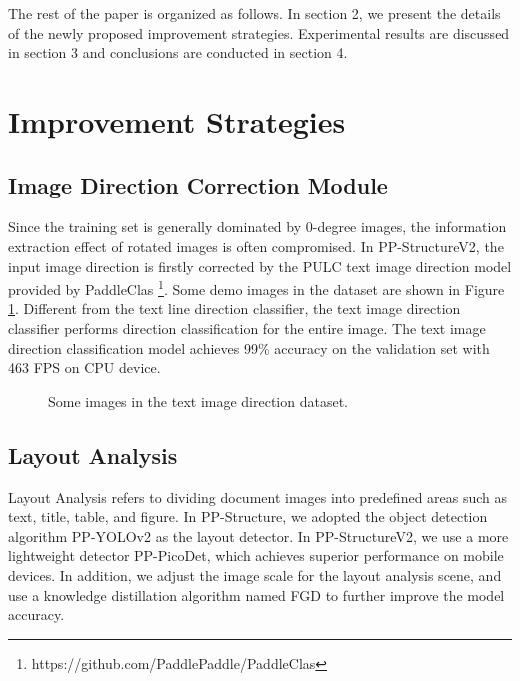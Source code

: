 \documentclass[letterpaper]{article} \usepackage{aaai21}  \usepackage{times}  \usepackage{helvet} \usepackage{courier}  \usepackage[hyphens]{url}  \usepackage{graphicx} \usepackage{algorithm}
\begin{document}
The rest of the paper is organized as follows. In section 2, we present the details of the newly proposed improvement strategies. Experimental results are discussed in section 3 and conclusions are conducted in section 4.

\section{Improvement Strategies}
 
\subsection{Image Direction Correction Module}

Since the training set is generally dominated by 0-degree images, the information extraction effect of rotated images is often compromised. In PP-StructureV2, the input image direction is firstly corrected by the PULC text image direction model\cite{PULC_text_image_orientation} provided by PaddleClas \footnote{https://github.com/PaddlePaddle/PaddleClas}. Some demo images in the dataset are shown in Figure \ref{text_image_orientation_data_demo}. Different from the text line direction classifier, the text image direction classifier performs direction classification for the entire image. The text image direction classification model achieves 99\% accuracy on the validation set with 463 FPS on CPU device.

\begin{figure}[]
\centering
{}
\caption{Some images in the text image direction dataset.}
\label{text_image_orientation_data_demo}
\end{figure}

\subsection{Layout Analysis}

Layout Analysis refers to dividing document images into predefined areas such as text, title, table, and figure. In PP-Structure, we adopted the object detection algorithm PP-YOLOv2\cite{ppyolov2} as the layout detector. In PP-StructureV2, we use a more lightweight detector PP-PicoDet\cite{picodet}, which achieves superior performance on mobile devices. In addition, we adjust the image scale for the layout analysis scene, and use a knowledge distillation algorithm named FGD\cite{fgd} to further improve the model accuracy.
\end{document}
